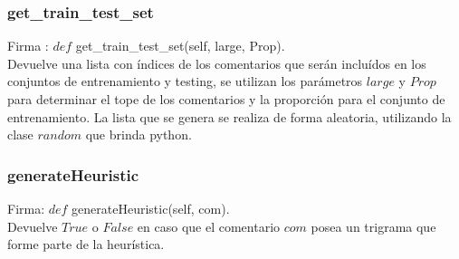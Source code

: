 \documentclass[12pt]{article}
\begin{document}
\subsubsection{get\_train\_test\_set}
Firma : $def$ get\_train\_test\_set(self, large, Prop). \\
Devuelve una lista con índices de los comentarios que serán incluídos en los conjuntos de entrenamiento y testing, se utilizan los parámetros $large$ y $Prop$ para determinar el tope de los comentarios y la proporción para el conjunto de entrenamiento. La lista que se genera se realiza de forma aleatoria, utilizando la clase $random$ que brinda python.

\subsubsection{generateHeuristic}
Firma: $def$ generateHeuristic(self, com). \\
Devuelve $True$ o $False$ en caso que el comentario $com$ posea un trigrama que forme parte de la heurística.
\end{document}
